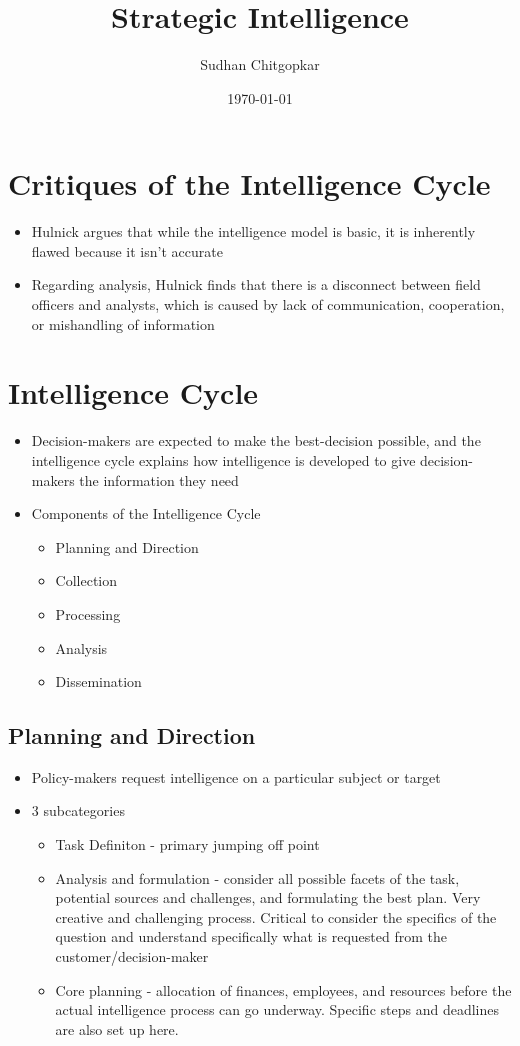 \documentclass[11pt]{article}
\author{Sudhan Chitgopkar}
\date{\today}
\title{Strategic Intelligence}
\begin{document}
\maketitle
\tableofcontents \clearpage\section{Critiques of the Intelligence Cycle}
\label{sec:org0662085}
\begin{itemize}
\item Hulnick argues that while the intelligence model is basic, it is inherently flawed because it isn't accurate
\item Regarding analysis, Hulnick finds that there is a disconnect between field officers and analysts, which is caused by lack of communication, cooperation, or mishandling of information
\end{itemize}
\section{Intelligence Cycle}
\label{sec:orgfd5c2e8}
\begin{itemize}
\item Decision-makers are expected to make the best-decision possible, and the intelligence cycle explains how intelligence is developed to give decision-makers the information they need
\item Components of the Intelligence Cycle
\begin{itemize}
\item Planning and Direction
\item Collection
\item Processing
\item Analysis
\item Dissemination
\end{itemize}
\end{itemize}
\subsection{Planning and Direction}
\label{sec:orge89d121}
\begin{itemize}
\item Policy-makers request intelligence on a particular subject or target
\item 3 subcategories
\begin{itemize}
\item Task Definiton - primary jumping off point
\item Analysis and formulation - consider all possible facets of the task, potential sources and challenges, and formulating the best plan. Very creative and challenging process. Critical to consider the specifics of the question and understand specifically what is requested from the customer/decision-maker
\item Core planning - allocation of finances, employees, and resources before the actual intelligence process can go underway. Specific steps and deadlines are also set up here.
\end{itemize}
\end{itemize}
\end{document}
